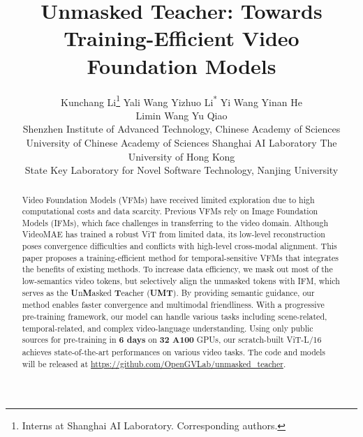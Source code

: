 \documentclass[10pt,twocolumn,letterpaper]{article}
\begin{document}
\title{Unmasked Teacher: Towards Training-Efficient Video Foundation Models}

\author{
    Kunchang Li\thanks{Interns at Shanghai AI Laboratory. \textsuperscript{}Corresponding authors.}\quad
    Yali Wang\textsuperscript{}\quad
    Yizhuo Li\textsuperscript{*}\quad
    Yi Wang\quad
    Yinan He\\
    Limin Wang\quad
    Yu Qiao\textsuperscript{}\vspace{0.2em}\\
\small{Shenzhen Institute of Advanced Technology, Chinese Academy of Sciences}\\
    \small{University of Chinese Academy of Sciences\quad
    Shanghai AI Laboratory\quad
    The University of Hong Kong}\\
    \small{State Key Laboratory for Novel Software Technology, Nanjing University}
}

\maketitle
\ificcvfinal\thispagestyle{empty}\fi


\begin{abstract}
Video Foundation Models (VFMs) have received limited exploration due to high computational costs and data scarcity. 
Previous VFMs rely on Image Foundation Models (IFMs), 
which face challenges in transferring to the video domain. 
Although VideoMAE has trained a robust ViT from limited data, 
its low-level reconstruction poses convergence difficulties and conflicts with high-level cross-modal alignment.
This paper proposes a training-efficient method for temporal-sensitive VFMs that integrates the benefits of existing methods.
To increase data efficiency,
we mask out most of the low-semantics video tokens,
but selectively align the unmasked tokens with IFM,
which serves as the \textbf{U}n\textbf{M}asked \textbf{T}eacher (\textbf{UMT}).
By providing semantic guidance,
our method enables faster convergence and multimodal friendliness.
With a progressive pre-training framework,
our model can handle various tasks including scene-related, temporal-related, and complex video-language understanding. 
Using only public sources for pre-training in \textbf{6 days} on \textbf{32 A100} GPUs,
our scratch-built ViT-L/16 achieves state-of-the-art performances on various video tasks.
The code and models will be released at \url{https://github.com/OpenGVLab/unmasked_teacher}.
\end{abstract}
\end{document}
